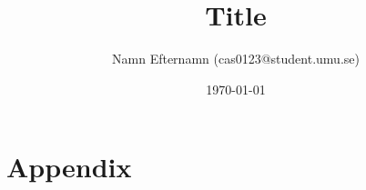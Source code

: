\documentclass[11pt]{article}
\title{Title}
\author{Namn Efternamn (cas0123@student.umu.se)}
\date{\today}
\begin{document}
\begin{titlepage}
  \maketitle
  \thispagestyle{fancy}
  \rhead{\today}
  \begin{abstract}

  \end{abstract}
\end{titlepage}

\lhead{\theauthor}
\rhead{\thetitle\\\today}
\cfoot{\thepage}



\begin{thebibliography}{9}
\end{thebibliography}

\clearpage
\appendix
\section{Appendix}
\end{document}
